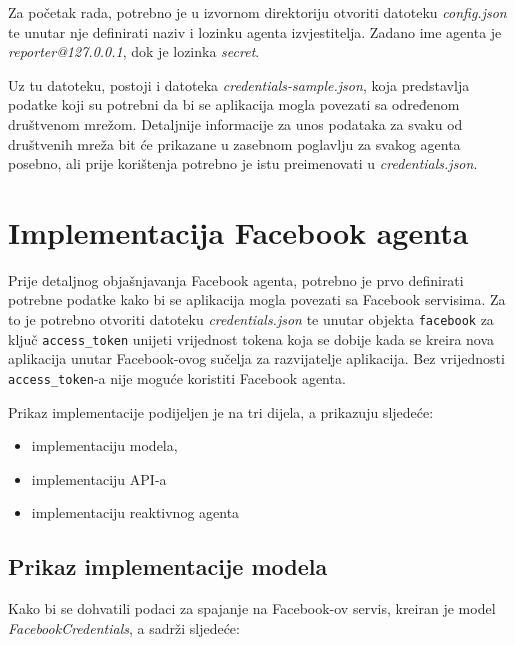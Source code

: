 \documentclass[a4paper,12pt]{foi}
\begin{document}
Za početak rada, potrebno je u izvornom direktoriju otvoriti datoteku \textit{config.json} te unutar nje definirati naziv i lozinku agenta izvjestitelja. Zadano ime agenta je \textit{reporter@127.0.0.1}, dok je lozinka \textit{secret}.

Uz tu datoteku, postoji i datoteka \textit{credentials-sample.json}, koja predstavlja podatke koji su potrebni da bi se aplikacija mogla povezati sa određenom društvenom mrežom. Detaljnije informacije za unos podataka za svaku od društvenih mreža bit će prikazane u zasebnom poglavlju za svakog agenta posebno, ali prije korištenja potrebno je istu preimenovati u \textit{credentials.json}.

\section{Implementacija Facebook agenta}

Prije detaljnog objašnjavanja Facebook agenta, potrebno je prvo definirati potrebne podatke kako bi se aplikacija mogla povezati sa Facebook servisima. 
Za to je potrebno otvoriti datoteku \textit{credentials.json} te unutar objekta \texttt{facebook} za ključ \texttt{access\_token} unijeti vrijednost tokena koja se dobije kada se kreira nova aplikacija unutar Facebook-ovog sučelja za razvijatelje aplikacija. Bez vrijednosti \texttt{access\_token}-a nije moguće koristiti Facebook agenta.

Prikaz implementacije podijeljen je na tri dijela, a prikazuju sljedeće:

\begin{itemize}
\item{implementaciju modela,}
\item{implementaciju API-a}
\item{implementaciju reaktivnog agenta}
\end{itemize}

\subsection{Prikaz implementacije modela}

Kako bi se dohvatili podaci za spajanje na Facebook-ov servis, kreiran je model \textit{FacebookCredentials}, a sadrži sljedeće:

\lstset{commentstyle=\textit,language=python}

\end{document}
